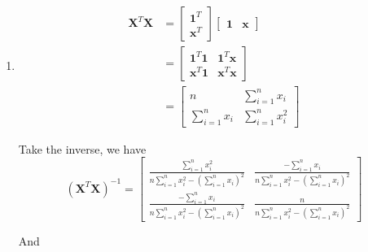 \documentclass{article}
\begin{document}
\begin{enumerate}[leftmargin = 0 em, label = \arabic*., font = \bfseries]
\begin{enumerate}
	\item
	\begin{align*}
	\bm X^T \bm X & = \begin{bmatrix}
		\bm 1^T \\
		\bm x^T
	\end{bmatrix}\begin{bmatrix}
		\bm 1 & \bm x
	\end{bmatrix}\\
	& = 
	\begin{bmatrix}
		\bm 1^T \bm 1 & \bm 1^T \bm x\\
		\bm x^T \bm 1 & \bm x^T \bm x
	\end{bmatrix}\\
	& = \begin{bmatrix}
		n & \sum_{i=1}^n x_i \\
		\sum_{i=1}^n x_i & \sum_{i=1}^n x_i^2
	\end{bmatrix}
	\end{align*}

	Take the inverse, we have 
	\[(\bm X^T \bm X)^{-1} = \begin{bmatrix}
		\frac{\sum_{i=1}^n x_i^2}{n \sum_{i=1}^n x_i^2 - (\sum_{i=1}^n x_i)^2} & \frac{-\sum_{i=1}^n x_i}{n \sum_{i=1}^n x_i^2 - (\sum_{i=1}^n x_i)^2}\\
		\frac{-\sum_{i=1}^n x_i}{n \sum_{i=1}^n x_i^2 - (\sum_{i=1}^n x_i)^2} & \frac{n}{n \sum_{i=1}^n x_i^2 - (\sum_{i=1}^n x_i)^2}
	\end{bmatrix}\]

	And 


\end{enumerate}
\end{enumerate}
\end{document}
